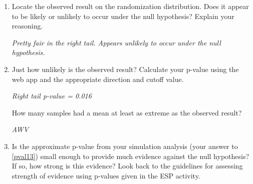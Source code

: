 \begin{enumerate}
\begin{key}
  {\it Again, centered at 0.15, because this is the null value. }
\end{key}

Remember why we conducted this simulation: to assess whether the
observed result (mean of 0.272) would be unlikely to occur by chance
alone if the ground water in New Hampshire is not hazardous. 

\item Locate the observed result on the randomization distribution.
  Does it appear to be likely or unlikely to occur under the null
  hypothesis?  Explain your reasoning.
\begin{students}
  \vspace{1cm}
\end{students}

\begin{key}
  {\it Pretty fair in the right tail.  Appears unlikely to occur under
    the null hypothesis. } 
\end{key}

\item \label{pval13}Just how unlikely is the observed result?  Calculate your
  p-value using the web app and the appropriate direction and cutoff value.
\begin{students}
  \vspace{1cm}
\end{students}

\begin{key}
  {\it Right tail p-value = 0.016}
\end{key}


 How many  samples had a mean at least as extreme as the
 observed result?  
\begin{students}
  \vspace{1cm}
\end{students}

\begin{key}
  {\it AWV}
\end{key}

\item Is the approximate p-value from your simulation analysis (your
  answer to \ref{pval13}) small enough to provide much evidence against the
  null hypothesis? If so, how strong is this evidence?  Look back to
  the guidelines for assessing strength of evidence using p-values
  given in the ESP activity.
\begin{students}
  \vspace{1cm}
\end{students}


\end{enumerate}
